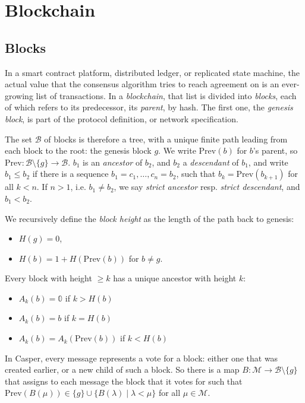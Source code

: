 \documentclass[12pt]{article}
\begin{document}
\section{Blockchain}
\label{sectionBlockchain}


\subsection{Blocks}

In a smart contract platform, distributed ledger, or replicated state machine, the actual value that the consensus algorithm tries to reach agreement on is an ever-growing list of transactions. In a \emph{blockchain}, that list is divided into \emph{blocks}, each of which refers to its predecessor, its \emph{parent}, by hash. The first one, the \emph{genesis block}, is part of the protocol definition, or network specification.

The set $\mathcal{B}$ of blocks is therefore a tree, with a unique finite path leading from each block to the root: the genesis block $g$. We write $\mathrm{Prev}(b)$ for $b$'s parent, so $\mathrm{Prev} : \mathcal{B} \setminus \{g\} \rightarrow \mathcal{B}$. $b_1$ is an \emph{ancestor} of $b_2$, and $b_2$ a \emph{descendant} of $b_1$, and write $b_1 \leq b_2$ if there is a sequence $b_1 = c_1, \ldots, c_n = b_2$, such that $b_k = \mathrm{Prev}(b_{k+1})$ for all $k < n$. If $n > 1$, i.e. $b_1 \neq b_2$, we say \emph{strict ancestor} resp. \emph{strict descendant}, and $b_1 < b_2$.

We recursively define the \emph{block height} as the length of the path back to genesis:
\begin{itemize}
    \item $H(g) = 0$,
    \item $H(b) = 1 + H(\mathrm{Prev}(b))$ for $b \neq g$.
\end{itemize}
Every block with height $\geq k$ has a unique ancestor with height $k$:
\begin{itemize}
    \item $A_k(b) = \mathbb{0}$ if $k > H(b)$
    \item $A_k(b) = b$ if $k = H(b)$
    \item $A_k(b) = A_k(\mathrm{Prev}(b))$ if $k < H(b)$
\end{itemize}

In Casper, every message represents a vote for a block: either one that was created earlier, or a new child of such a block. So there is a map $B : \mathcal{M} \rightarrow \mathcal{B} \setminus \{g\}$ that assigns to each message the block that it votes for such that $\mathrm{Prev}(B(\mu)) \in \{g\} \cup \{ B(\lambda) \mid \lambda < \mu\}$ for all $\mu \in \mathcal{M}$.
\end{document}

